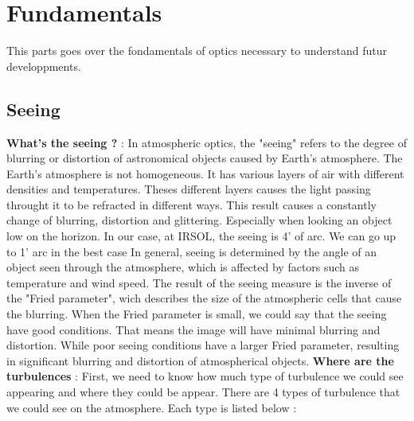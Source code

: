 \section{Fundamentals}
This parts goes over the fondamentals of optics necessary to understand futur developpments.
\subsection{Seeing}
\textbf{What's the seeing ?} : \newline In atmospheric optics, the "seeing" refers to the degree of blurring or distortion of astronomical objects
caused by Earth's atmosphere. The Earth's atmosphere is not homogeneous. It has various layers of air with different densities and temperatures.
Theses different layers causes the light passing throught it to be refracted in different ways. This result causes a constantly change of blurring,
distortion and glittering. Especially when looking an object low on the horizon. In our case, at IRSOL, the seeing is 4' of arc. We can go up
to 1' arc in the best case\newline
In general, seeing is determined by the angle of an object seen through the atmosphere, which is affected by factors such as temperature and wind speed.
The result of the seeing measure is the inverse of the "Fried parameter", wich describes the size of the atmospheric cells that cause the blurring.
When the Fried parameter is small, we could say that the seeing have good conditions. That means the image will have minimal blurring and distortion.
While poor seeing conditions have a larger Fried parameter, resulting in significant blurring and distortion of atmospherical objects.
\bigbreak
\textbf{Where are the turbulences} : \newline
First, we need to know how much type of turbulence we could see appearing and where they could be appear.\newline
There are 4 types of turbulence that we could see on the atmosphere. Each type is listed below :
